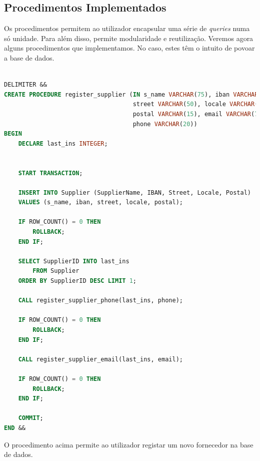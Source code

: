 \documentclass[a4paper,12pt]{scrreprt}
\begin{document}
\subsection{Procedimentos Implementados}
Os procedimentos permitem ao utilizador encapsular uma série de \textit{queries} numa só unidade. Para além disso, permite modularidade e reutilização.
Veremos agora alguns procedimentos que implementamos. No caso, estes têm o intuito de povoar a base de dados.
\begin{lstlisting}[language=sql]

DELIMITER &&
CREATE PROCEDURE register_supplier (IN s_name VARCHAR(75), iban VARCHAR(50),
                                    street VARCHAR(50), locale VARCHAR(30), 
                                    postal VARCHAR(15), email VARCHAR(75), 
                                    phone VARCHAR(20))
BEGIN
    DECLARE last_ins INTEGER;


    START TRANSACTION;

    INSERT INTO Supplier (SupplierName, IBAN, Street, Locale, Postal)
    VALUES (s_name, iban, street, locale, postal);

    IF ROW_COUNT() = 0 THEN
        ROLLBACK;
    END IF;

    SELECT SupplierID INTO last_ins 
        FROM Supplier 
    ORDER BY SupplierID DESC LIMIT 1;

    CALL register_supplier_phone(last_ins, phone);

    IF ROW_COUNT() = 0 THEN
        ROLLBACK;
    END IF;

    CALL register_supplier_email(last_ins, email);

    IF ROW_COUNT() = 0 THEN
        ROLLBACK;
    END IF;
    
    COMMIT;
END &&
\end{lstlisting}

O procedimento acima permite ao utilizador registar um novo fornecedor na base de dados.
\end{document}
